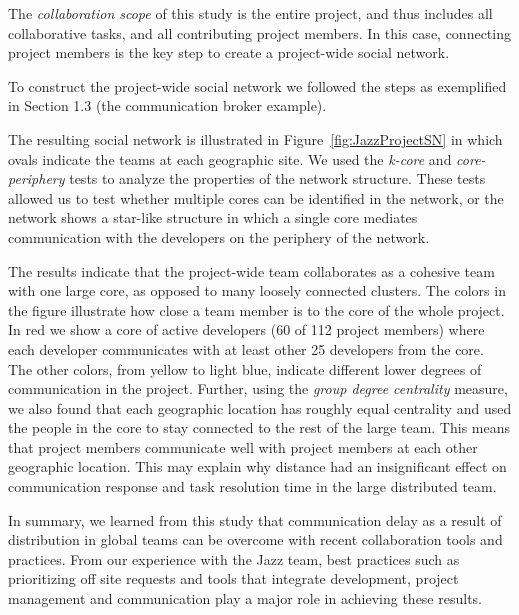 The \emph{collaboration scope} of this study is the entire project, and thus
includes all collaborative tasks, and all contributing project members. In this
case, connecting project members is the key step to create a project-wide social
network. 

To construct the project-wide social network we followed the steps as
exemplified in Section 1.3 (the communication broker example).


The resulting social network is illustrated in Figure~\ref{fig:JazzProjectSN} in
which ovals indicate the teams at each geographic site. We used the \emph{k-core}
and \emph{core-periphery} tests \cite{Wasserman:1994dz} to analyze the properties
of the network structure. These tests allowed us to test whether multiple
cores can be identified in the network, or the network shows a star-like 
structure in which a single core mediates communication with the developers on
the periphery of the network.

The results indicate that the project-wide team collaborates as a cohesive team
with one large core, as opposed to many loosely connected clusters. The colors in
the figure illustrate how close a team member is to the core of the whole
project. In red we show a core of active developers (60 of
112 project members) where each developer
communicates with at least other 25 developers from the core. The other
colors, from yellow to light blue, indicate different lower degrees of communication in
the project. Further, using the
\emph{group degree centrality} \cite{Wasserman:1994dz} measure, we also found
that each geographic location has roughly equal centrality and used the people in
the core to stay connected to the rest of the large team. This means that project
members communicate well with project members at each other geographic location.
This may explain why distance had an insignificant effect on communication response
and task resolution time in the large distributed team.

In summary, we learned from this study that communication delay as a result of
distribution in global teams can be overcome with recent
collaboration tools and practices. From our experience with the Jazz team, best practices such as prioritizing
off site requests and tools that integrate development, project
management and communication play a major role in achieving these results.

